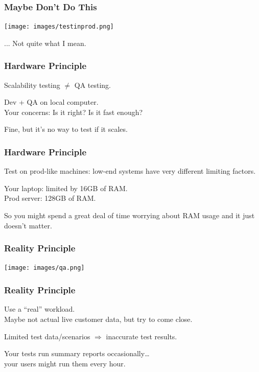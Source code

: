 \begin{frame}
\frametitle{Maybe Don't Do This}

\begin{center}
	\texttt{[image: images/testinprod.png]}
\end{center}

... Not quite what I mean.

\end{frame}

\begin{frame}
\frametitle{Hardware Principle}



Scalability testing $\neq$  QA testing.

Dev + QA on local computer.\\
\quad Your concerns: Is it right? Is it fast enough?

Fine, but it's no way to test if it scales. 


\end{frame}



\begin{frame}
\frametitle{Hardware Principle}



Test on prod-like machines: low-end systems have very different limiting factors.

Your laptop: limited by 16GB of RAM.\\
Prod server: 128GB of RAM.


So you might spend a great deal of time worrying about RAM usage and it just doesn't matter.


\end{frame}



\begin{frame}
\frametitle{Reality Principle}

\begin{center}
	\texttt{[image: images/qa.png]}
\end{center}


\end{frame}


\begin{frame}
\frametitle{Reality Principle}


Use a ``real'' workload.\\
\quad Maybe not actual live customer data, but try to come close.

Limited test data/scenarios $\Rightarrow$ inaccurate test results.


Your tests run summary reports occasionally\ldots\\
\quad your users might run them every hour. 

\end{frame}



